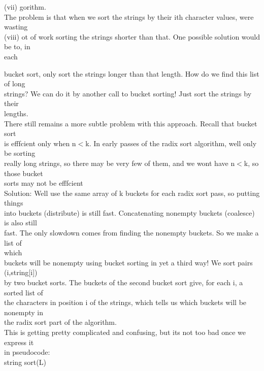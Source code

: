 \documentclass[a4paper,11pt]{article}
\begin{document}
\newpage
\begin{flushleft}
{
(vii) gorithm.
\\ }
{
\raggedleft
The problem is that when we sort the strings by their ith character values, were
\\ }
{
wasting
\\ }
{
\centering
(viii) ot of work sorting the strings shorter than that. One possible solution would be to, in
\\ }
{
each
}
\end{flushleft}
\newpage
\begin{flushleft}
{
\raggedleft
bucket sort, only sort the strings longer than that length. How do we find this list of long
\\ strings? We can do it by another call to bucket sorting! Just sort the strings by their
\\ lengths.
\\ There still remains a more subtle problem with this approach. Recall that bucket sort
\\ is efffcient only when n$<$k. In early passes of the radix sort algorithm, well only be sorting
\\ really long strings, so there may be very few of them, and we wont have n$<$k, so those bucket
\\ }
{
sorts may not be efffcient
\\ }
{
\raggedleft
Solution: Well use the same array of k buckets for each radix sort pass, so putting things
\\ into buckets (distribute) is still fast. Concatenating nonempty buckets (coalesce) is also still
\\ fast. The only slowdown comes from finding the nonempty buckets. So we make a list of
\\ which
\\ buckets will be nonempty using bucket sorting in yet a third way! We sort pairs (i,string[i])
\\ by two bucket sorts. The buckets of the second bucket sort give, for each i, a sorted list of
\\ the characters in position i of the strings, which tells us which buckets will be nonempty in
\\ }
{
the radix sort part of the algorithm.
\\ }
{
\raggedleft
This is getting pretty complicated and confusing, but its not too bad once we express it
\\ }
{
in pseudocode:
\\ string sort(L)
}
\end{flushleft}
\end{document}
